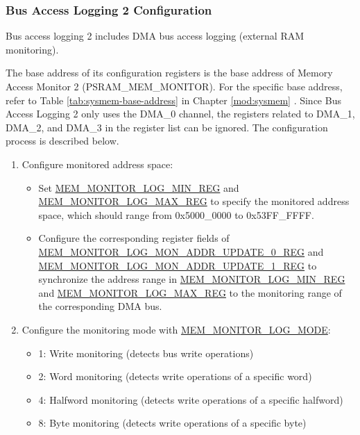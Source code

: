 \documentclass[main\_\_EN.tex]{subfiles}
\begin{document}
\subsubsection{Bus Access Logging 2 Configuration}

Bus access logging 2 includes DMA bus access logging (external RAM monitoring).

The base address of its configuration registers is the base address of Memory Access Monitor 2 (PSRAM\_MEM\_MONITOR). For the specific base address, refer to Table \ref{tab:sysmem-base-address} in Chapter \ref{mod:sysmem} \textit{}. Since Bus Access Logging 2 only uses the DMA\_0 channel, the registers related to DMA\_1, DMA\_2, and DMA\_3 in the register list can be ignored. The configuration process is described below.

\begin{enumerate}
    \item Configure monitored address space:
        \begin{itemize}
            \item Set \hyperref[regdesc:MEMMONITORLOGMINREG]{MEM\_MONITOR\_LOG\_MIN\_REG} and \hyperref[regdesc:MEMMONITORLOGMAXREG]{MEM\_MONITOR\_LOG\_MAX\_REG} to specify the monitored address space, which should range from 0x5000\_0000 to 0x53FF\_FFFF.
            \item Configure the corresponding register fields of \hyperref[regdesc:MEMMONITORLOGMONADDRUPDATE0REG]{MEM\_MONITOR\_LOG\_MON\_ADDR\_UPDATE\_0\_REG} and \hyperref[regdesc:MEMMONITORLOGMONADDRUPDATE1REG]{MEM\_MONITOR\_LOG\_MON\_ADDR\_UPDATE\_1\_REG} to synchronize the address range in \hyperref[regdesc:MEMMONITORLOGMINREG]{MEM\_MONITOR\_LOG\_MIN\_REG} and \hyperref[regdesc:MEMMONITORLOGMAXREG]{MEM\_MONITOR\_LOG\_MAX\_REG} to the monitoring range of the corresponding  DMA bus.
        \end{itemize}
    \item Configure the monitoring mode with \hyperref[fielddesc:MEMMONITORLOGMODE]{MEM\_MONITOR\_LOG\_MODE}:
        \begin{itemize}
            \item 1: Write monitoring (detects bus write operations)
            \item 2: Word monitoring (detects write operations of a specific word)
            \item 4: Halfword monitoring (detects write operations of a specific halfword)
            \item 8: Byte monitoring (detects write operations of a specific byte)

\end{itemize}
\end{enumerate}
\end{document}
